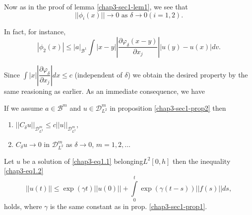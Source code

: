Now as in the proof of lemma \ref{chap3-sec1-lem1},  we see that
$$
|| \phi_i (x)|| \to 0 \text{ as } \delta \to 0 (i=1,  2). 
$$

In fact, for instance, 
$$
|\phi_2 (x)| \leq | a |_{\mathscr{B}^1} \int |x-y|| \frac{\partial
  \varphi_\delta (x-y)}{\partial x_j}||u(y)- u(x)|dv.  
$$

Since $\int |x| |\dfrac{\partial \varphi_\delta}{\partial x_j}| dx
\leq c$ (independent of $\delta $) we obtain the desired property by
the same reasioning as earlier. As an immediate consequence,  we have 

\setcounter{corollary}{0}
\begin{corollary}\label{chap3-sec1-coro1}%
If we assume $a \in \mathscr{B}^m$ and $u \in
\mathscr{D}^m_{L^2}$ in proposition \ref{chap3-sec1-prop2} then 
\begin{enumerate}[\rm(1)]
\item $|| C_\delta u ||_{\mathscr{D}^m_{L^2}}  \leq c ||u
  ||_{\mathscr{D}^m_{L^2}}$,\pageoriginale 

\item $ C_\delta u \to 0$ in $\mathscr{D}^m_{L^2} $ as $\delta \to
  0$, $m = 1, 2,\ldots $ 
\end{enumerate}
\end{corollary}

\begin{proposition}[Friedrichs]\label{chap3-sec1-prop3}%
 Let $u$ be a solution of \eqref{chap3-eq1.1} belonging\break $L^2 [0,
   h]$ then the 
 inequality \eqref{chap3-eq1.2} 
$$
|| u (t) || \leq \exp (\gamma t)|| u (0) || + \int\limits^{t}_{0}
\exp (\gamma (t-s))|| f (s)|| ds, 
$$
holds, where $\gamma$ is the same constant as in prop. \ref{chap3-sec1-prop1}. 
\end{proposition}

